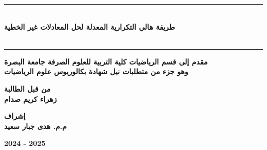 \begin{titlepage}
	\vspace{1cm}
	
	\begin{center}
		\rule{100mm}{0.5mm}\\
		\vspace{1cm}
\Large\textbf{
طريقة هالي التكرارية المعدلة لحل المعادلات غير الخطية
}\\
\Large\textbf{}\\
		\vspace{12pt}
		\rule{100mm}{0.5mm}
	\end{center}
	\vfill
	\begin{center}
		\large
		\textbf{مقدم إلى قسم الرياضيات كلية التربية للعلوم الصرفة جامعة البصرة\\
			\vspace{6pt}
			وهو جزء من متطلبات نيل شهادة بكالوريوس علوم الرياضيات}
	\end{center}
	\vfill
	\begin{center}
		\large
		\textbf{من قبل الطالبة}\\
		\vspace{8pt}
		 \large
		\textbf{زهراء كريم صدام}
	\end{center}
	\vspace{10pt}
	\begin{center}
		\large
		\textbf{إشراف}\\
		\vspace{8pt}
		 \large
		\textbf{م.م. هدى جبار سعيد}
	\end{center}
	\vspace{10pt}
	\begin{center}
		\large 
		\textbf{2024 - 2025}
	\end{center}
\end{titlepage}

